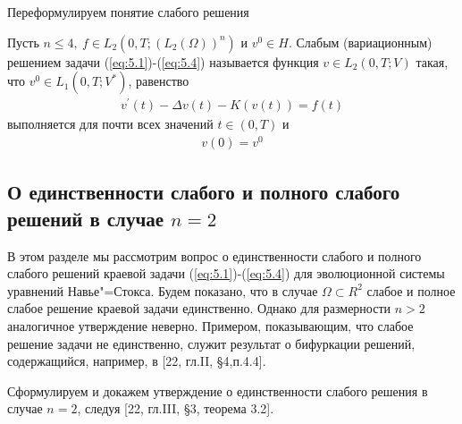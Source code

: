 Переформулируем понятие слабого решения
\begin{definition}
    Пусть $n \le 4, \ f \in L_2(0, T; (L_2(\Omega))^n)$ и $v^0 \in H$. Слабым (вариационным) решением задачи (\ref{eq:5.1})-(\ref{eq:5.4}) называется функция
    $v \in L_2(0, T; V)$ такая, что $v^0 \in L_1(0, T; V^\ast)$, равенство
    \begin{equation}\label{eq:5.11}
        \begin{gathered}
            v^\prime(t) - \Delta v(t) - K(v(t)) = f(t)
        \end{gathered}
    \end{equation}
    выполняется для почти всех значений $t \in (0, T)$ и
    \begin{equation}\label{eq:5.12}
        \begin{gathered}
            v(0) = v^0
        \end{gathered}
    \end{equation}
\end{definition}


\subsection {О единственности слабого и полного слабого решений в случае $n = 2$}
В этом разделе мы рассмотрим вопрос о единственности слабого и полного слабого решений краевой задачи (\ref{eq:5.1})-(\ref{eq:5.4}) для эволюционной
системы уравнений Навье"=Стокса. Будем показано, что в случае $\Omega \subset R^2$ слабое и полное слабое решение краевой задачи единственно.
Однако для размерности $n > 2$ аналогичное утверждение неверно. Примером, показывающим, что слабое решение задачи не единственно, служит результат
о бифуркации решений, содержащийся, например, в [22, гл.II, \S 4,п.4.4].

Сформулируем и докажем утверждение о единственности слабого решения в случае $n = 2$, следуя [22, гл.III, \S 3, теорема 3.2].

